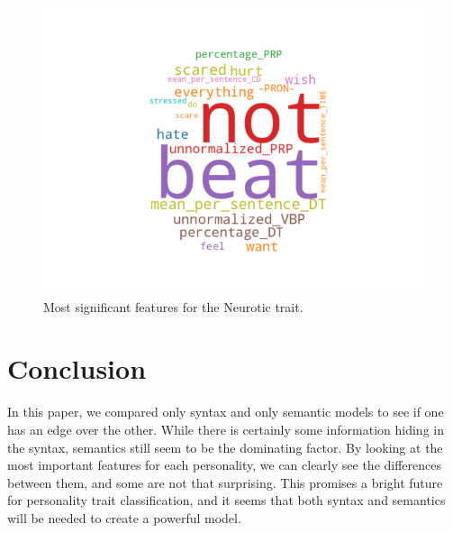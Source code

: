 \documentclass[10pt, a4paper]{article}
\begin{document}
\begin{figure}
\begin{center}
  \includegraphics[width=\columnwidth]{figures/cNEU.png}
  \caption{Most significant features for the Neurotic trait.}
  \label{fig:figure5}
\end{center}
\end{figure}

\section{Conclusion}
In this paper, we compared only syntax and only semantic models to see if one has an edge over the other.
While there is certainly some information hiding in the syntax, semantics still seem to be the dominating factor.
By looking at the most important features for each personality, we can clearly see the differences between them, and some are not that surprising.
This promises a bright future for personality trait classification, and it seems that both syntax and semantics will be needed to create a powerful model.



\end{document}
